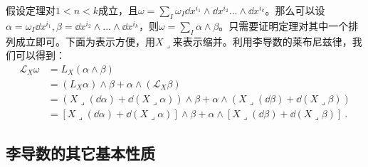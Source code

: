 假设定理对$1<n<k$成立，且$\omega=\sum_{I}\omega_I\dd x^{i_1}\wedge\dd x^{i_2}...\wedge \dd x^{i_k}$。那么可以设$\alpha=\omega_I\dd x^{i_1},\beta=\dd x^{i_2}\wedge...\wedge\dd x^{i_k}$，则$\omega=\sum_I\alpha\wedge\beta$。只需要证明定理对其中一个排列成立即可。下面为表示方便，用$X\lrcorner$来表示缩并。利用李导数的莱布尼兹律，我们可以得到：
\begin{equation}
\begin{aligned}
\mathcal L_X\omega&=L_X(\alpha\wedge\beta)\\
&=(L_X\alpha)\wedge\beta+\alpha\wedge (\mathcal L_X\beta)\\
&=(X\lrcorner(\dd \alpha)+\dd (X\lrcorner\alpha))\wedge\beta+\alpha\wedge(X\lrcorner(\dd \beta)+\dd (X\lrcorner\beta))\\
&=[X\lrcorner(\dd \alpha)+\dd(X\lrcorner\alpha)]\wedge\beta+\alpha\wedge[X\lrcorner(\dd \beta)+\dd(X\lrcorner\beta)]~.
\end{aligned}
\end{equation}




\subsection{李导数的其它基本性质}
